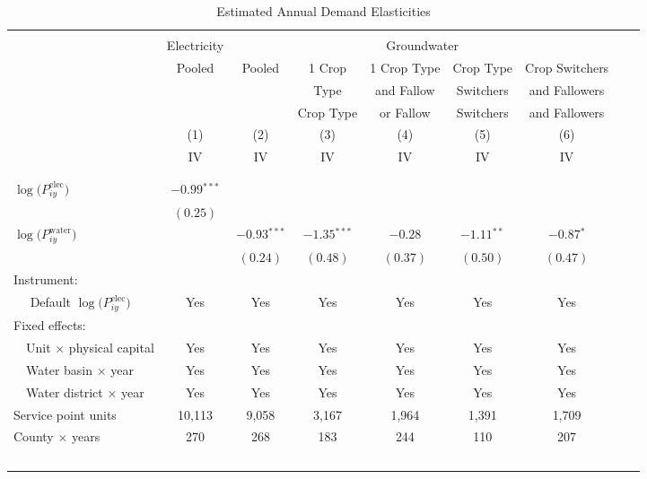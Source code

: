 \begin{table}[t!]\centering
\small
\caption{Estimated Annual Demand Elasticities  \label{tab:elec_water_regs_annual}}
\vspace{-0.1cm}
\small
\begin{adjustbox}{center} 
\begin{tabular}{lcccccccc} 
\hline \hline
\vspace{-0.37cm}
\\
 & \multicolumn{1}{c}{Electricity} & \multicolumn{5}{c}{Groundwater} \\
 \cmidrule(r){2-2} \cmidrule(l){3-7}
  & Pooled & Pooled & 1 Crop & 1 Crop Type & Crop Type & Crop Switchers \\
 &  &  & Type & and Fallow & Switchers & and Fallowers \\
 &  &  & Crop Type & or Fallow & Switchers & and Fallowers \\
[0.1em]
 & (1)  & (2)  & (3)  & (4)  & (5)  & (6) \\ 
[0.1em]
 & IV & IV & IV & IV & IV & IV \\
\vspace{-0.37cm}
\\
\cline{2-7}
\vspace{-0.27cm}
\\
 $\log\big(P^{\text{elec}}_{iy}\big)$ ~ & 
 $-0.99$$^{***}$  & \\ 
& $(0.25)$ \\
[0.1em] 
 $\log\big(P^{\text{water}}_{iy}\big)$ ~ & 
& $-0.93$$^{***}$ & $-1.35$$^{***}$ & $-0.28$ & $-1.11$$^{**}$  & $-0.87$$^{*}$ \\ 
& & $(0.24)$ & $(0.48)$ & $(0.37)$ & $(0.50)$ & $(0.47)$ \\
[1.5em] 
Instrument: \\
[0.1em] 
~~ Default $\log\big(P^{\text{elec}}_{iy}\big)$  & Yes & Yes & Yes  & Yes  & Yes & Yes \\
[1.5em] 
Fixed effects: \\
[0.1em] 
~~Unit $\times$ physical capital & Yes & Yes & Yes & Yes & Yes & Yes  \\
[0.1em] 
~~Water basin $\times$ year  & Yes & Yes & Yes & Yes & Yes & Yes    \\
[0.1em] 
~~Water district $\times$ year  & Yes & Yes & Yes & Yes & Yes & Yes  \\
[1.5em] 
Service point units & 10,113 & 9,058 & 3,167 & 1,964 & 1,391 & 1,709  \\ 
[0.1em] 
County $\times$ years  & 270 & 268 & 183 & 244 & 110 & 207 \\ 
$$
\end{tabular}
\end{adjustbox}
\end{table}
